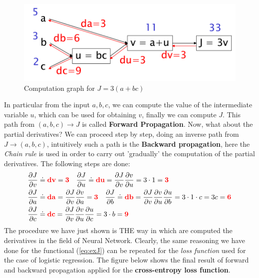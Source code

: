 \begin{figure}[h]
    \centering
    \includegraphics[scale=0.5]{img/computation_graph.png}
    \caption{Computation graph for $J=3(a+bc)$}
\end{figure}
\noindent
In particular from the input $a,b,c$, we can compute the value of the intermediate variable $u$, which can be used for obtaining $v$, finally we can compute $J$. This path from $(a,b,c)\to{J}$ is called \textbf{Forward Propagation}. Now, what about the partial derivatives? We can proceed step by step, doing an inverse path from $J\to(a,b,c)$, intuitively such a path is the \textbf{Backward propagation}, here the \textit{Chain rule} is used in order to carry out 'gradually' the computation of the partial derivatives.
The following steps are done:
\begin{align*}
    &\frac{\partial{J}}{\partial{v}}\doteq{\color{red}\mathbf{dv}}=\mathbf{\color{red}3} \quad
    \frac{\partial{J}}{\partial{u}}\doteq{\color{red}\mathbf{du}}=
    \frac{\partial{J}}{\partial{v}} \frac{\partial{v}}{\partial{u}} = 3 \cdot 1 = \mathbf{\color{red}3}\\
    &\frac{\partial{J}}{\partial{a}} \doteq{\color{red}\mathbf{da}}=
    \frac{\partial{J}}{\partial{v}} \frac{\partial{v}}{\partial{a}} = \mathbf{\color{red}3} \quad
    \frac{\partial{J}}{\partial{b}}\doteq{\color{red}\mathbf{db}}=
    \frac{\partial{J}}{\partial{v}}\frac{\partial{v}}{\partial{u}}\frac{\partial{u}}{\partial{b}}=3\cdot{1}\cdot{c}=3c=\mathbf{\color{red}6}\\
    &\frac{\partial{J}}{\partial{c}}\doteq{\color{red}\mathbf{dc}}=
    \frac{\partial{J}}{\partial{v}}\frac{\partial{v}}{\partial{u}}\frac{\partial{u}}{\partial{c}}=3\cdot{b}=\mathbf{\color{red}9}
\end{align*}
The procedure we have just shown is THE way in which are computed the derivatives in the field of Neural Network. Clearly, the same reasoning we have done for the functional (\ref{eq:exJ}) can be repeated for the \textit{loss function} used for the case of logistic regression. The figure below shows the final result of forward and backward propagation applied for the \textbf{cross-entropy loss function}.

